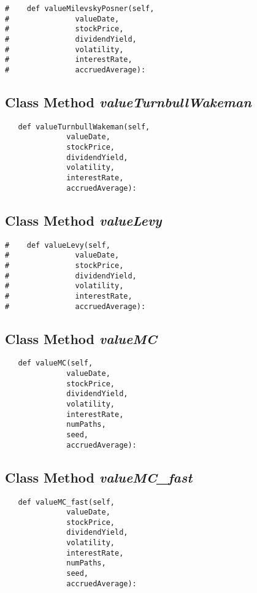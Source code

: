 \documentclass[twoside,11pt]{book}
\begin{document}
\begin{lstlisting}
#    def valueMilevskyPosner(self,
#               valueDate,
#               stockPrice,
#               dividendYield,
#               volatility,
#               interestRate,
#               accruedAverage):
\end{lstlisting}

\subsection{Class Method {\it valueTurnbullWakeman}}


\begin{lstlisting}
   def valueTurnbullWakeman(self,
              valueDate,
              stockPrice,
              dividendYield,
              volatility,
              interestRate,
              accruedAverage):
\end{lstlisting}

\subsection{Class Method {\it valueLevy}}


\begin{lstlisting}
#    def valueLevy(self,
#               valueDate,
#               stockPrice,
#               dividendYield,
#               volatility,
#               interestRate,
#               accruedAverage):
\end{lstlisting}

\subsection{Class Method {\it valueMC}}


\begin{lstlisting}
   def valueMC(self,
              valueDate,
              stockPrice,
              dividendYield,
              volatility,
              interestRate,
              numPaths,
              seed,
              accruedAverage):
\end{lstlisting}

\subsection{Class Method {\it valueMC\_fast}}


\begin{lstlisting}
   def valueMC_fast(self,
              valueDate,
              stockPrice,
              dividendYield,
              volatility,
              interestRate,
              numPaths,
              seed,
              accruedAverage):
\end{lstlisting}
\end{document}
